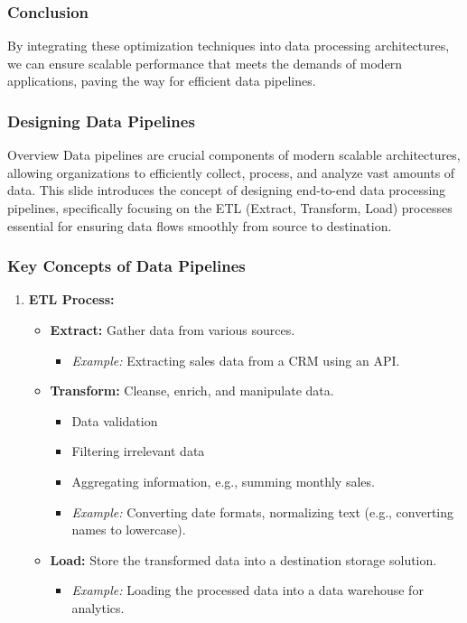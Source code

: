 \documentclass{beamer}
\begin{document}
\begin{frame}[fragile]
    \frametitle{Conclusion}
    By integrating these optimization techniques into data processing architectures,
    we can ensure scalable performance that meets the demands of modern applications,
    paving the way for efficient data pipelines.
\end{frame}

\begin{frame}[fragile]
    \frametitle{Designing Data Pipelines}
    \begin{block}{Overview}
        Data pipelines are crucial components of modern scalable architectures, allowing organizations to efficiently collect, process, and analyze vast amounts of data.
        This slide introduces the concept of designing end-to-end data processing pipelines, specifically focusing on the ETL (Extract, Transform, Load) processes essential for ensuring data flows smoothly from source to destination.
    \end{block}
\end{frame}

\begin{frame}[fragile]
    \frametitle{Key Concepts of Data Pipelines}
    \begin{enumerate}
        \item \textbf{ETL Process:}
        \begin{itemize}
            \item \textbf{Extract:} Gather data from various sources. 
            \begin{itemize}
                \item \textit{Example:} Extracting sales data from a CRM using an API.
            \end{itemize}
            \item \textbf{Transform:} Cleanse, enrich, and manipulate data.
            \begin{itemize}
                \item Data validation
                \item Filtering irrelevant data
                \item Aggregating information, e.g., summing monthly sales.
                \item \textit{Example:} Converting date formats, normalizing text (e.g., converting names to lowercase).
            \end{itemize}
            \item \textbf{Load:} Store the transformed data into a destination storage solution.
            \begin{itemize}
                \item \textit{Example:} Loading the processed data into a data warehouse for analytics.
            \end{itemize}
        \end{itemize}
    \end{enumerate}
\end{frame}
\end{document}
